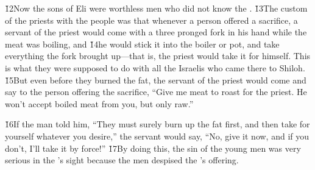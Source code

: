 \v{12}Now the sons of Eli were worthless men who did not know the . \v{13}The custom of the priests with the people was that whenever a person offered a sacrifice, a servant of the priest would come with a three pronged fork in his hand while the meat was boiling, and \v{14}he would stick it into the boiler or pot, and take everything the fork brought up---that is, the priest would take it for himself. This is what they were supposed to do with all the Israelis who came there to Shiloh. \v{15}But even before they burned the fat, the servant of the priest would come and say to the person offering the sacrifice, ``Give me meat to roast for the priest. He won't accept boiled meat from you, but only raw.''

\v{16}If the man told him, ``They must surely burn up the fat first, and then take for yourself whatever you desire,'' the servant would say, ``No, give it now, and if you don't, I'll take it by force!'' \v{17}By doing this, the sin of the young men was very serious in the 's sight because the men despised the 's offering.

